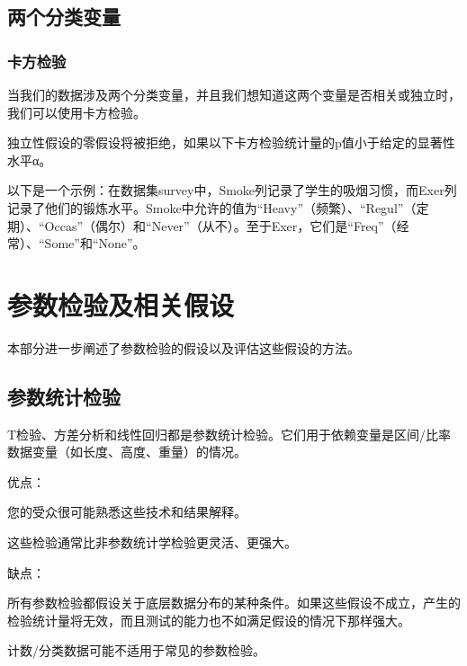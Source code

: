 \documentclass[]{book}
\begin{document}
\hypertarget{ux4e24ux4e2aux5206ux7c7bux53d8ux91cf-1}{%
\subsection{两个分类变量}\label{ux4e24ux4e2aux5206ux7c7bux53d8ux91cf-1}}

\hypertarget{ux5361ux65b9ux68c0ux9a8c}{%
\subsubsection{卡方检验}\label{ux5361ux65b9ux68c0ux9a8c}}

当我们的数据涉及两个分类变量，并且我们想知道这两个变量是否相关或独立时，我们可以使用卡方检验。

独立性假设的零假设将被拒绝，如果以下卡方检验统计量的p值小于给定的显著性水平α。

以下是一个示例：在数据集survey中，Smoke列记录了学生的吸烟习惯，而Exer列记录了他们的锻炼水平。Smoke中允许的值为``Heavy''（频繁）、``Regul''（定期）、``Occas''（偶尔）和``Never''（从不）。至于Exer，它们是``Freq''（经常）、``Some''和``None''。

\hypertarget{ux53c2ux6570ux68c0ux9a8cux53caux76f8ux5173ux5047ux8bbe}{%
\section{参数检验及相关假设}\label{ux53c2ux6570ux68c0ux9a8cux53caux76f8ux5173ux5047ux8bbe}}

本部分进一步阐述了参数检验的假设以及评估这些假设的方法。

\hypertarget{ux53c2ux6570ux7edfux8ba1ux68c0ux9a8c}{%
\subsection{参数统计检验}\label{ux53c2ux6570ux7edfux8ba1ux68c0ux9a8c}}

T检验、方差分析和线性回归都是参数统计检验。它们用于依赖变量是区间/比率数据变量（如长度、高度、重量）的情况。

优点：

您的受众很可能熟悉这些技术和结果解释。

这些检验通常比非参数统计学检验更灵活、更强大。

缺点：

所有参数检验都假设关于底层数据分布的某种条件。如果这些假设不成立，产生的检验统计量将无效，而且测试的能力也不如满足假设的情况下那样强大。

计数/分类数据可能不适用于常见的参数检验。
\end{document}
